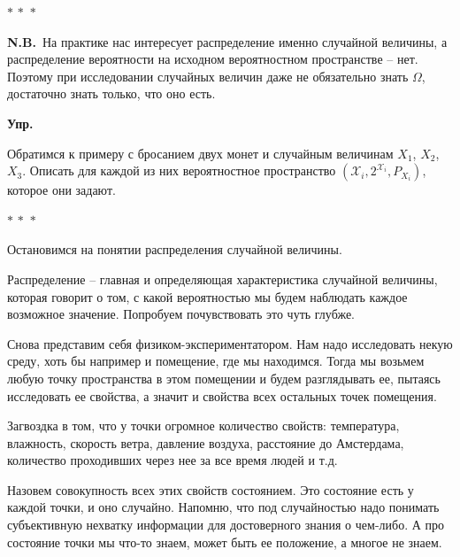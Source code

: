 \documentclass[a4paper,12pt]{article}
\newcommand{\threestars}{\begin{center}$ {\ast}\,{\ast}\,{\ast} $\end{center}}
\newcounter{z-counter}
\newcounter{th-counter}
\newcounter{col-counter}
\newcommand{\NB}[1]{%
  \par\medskip
  \noindent\textcolor{notecolor}{\textbf{N.B.}~#1}%
  \par\medskip
}
\newenvironment{exercise}{%
  \par\noindent\color{blue!70!black}\textbf{Упр.}%
}{\par}
\begin{document}
\begin{center}
\end{center}

\threestars

\NB{На практике нас интересует распределение именно случайной величины, а распределение вероятности на исходном вероятностном пространстве -- нет. Поэтому при исследовании случайных величин даже не обязательно знать $\Omega$, достаточно знать только, что оно есть.}

\begin{exercise}
    Обратимся к примеру с бросанием двух монет и случайным величинам $X_1$, $X_2$, $X_3$. Описать для каждой из них вероятностное пространство $(\mathcal{X}_i, 2^{\mathcal{X}_i}, P_{X_i})$, которое они задают.
\end{exercise}

\threestars

Остановимся на понятии распределения случайной величины.

Распределение -- главная и определяющая характеристика случайной величины, которая говорит о том, с какой вероятностью мы будем наблюдать каждое возможное значение. Попробуем почувствовать это чуть глубже.

Снова представим себя физиком-экспериментатором. Нам надо исследовать некую среду, хоть бы например и помещение, где мы находимся. Тогда мы возьмем любую точку пространства в этом помещении и будем разглядывать ее, пытаясь исследовать ее свойства, а значит и свойства всех остальных точек помещения.

Загвоздка в том, что у точки огромное количество свойств: температура, влажность, скорость ветра, давление воздуха, расстояние до Амстердама, количество проходивших через нее за все время людей и т.д.

Назовем совокупность всех этих свойств состоянием. Это состояние есть у каждой точки, и оно случайно. Напомню, что под случайностью надо понимать субъективную нехватку информации для достоверного знания о чем-либо. А про состояние точки мы что-то знаем, может быть ее положение, а многое не знаем.
\end{document}
